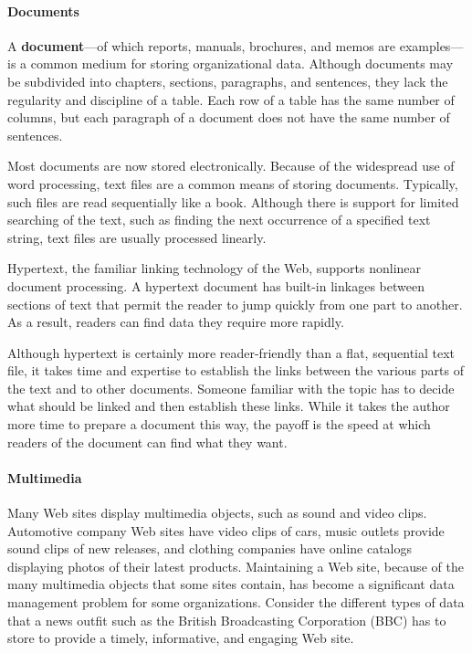 \documentclass[
]{article}
\begin{document}
\hypertarget{documents}{%
\paragraph*{Documents}\label{documents}}

A \textbf{document}---of which reports, manuals, brochures, and memos are
examples---is a common medium for storing organizational data. Although
documents may be subdivided into chapters, sections, paragraphs, and
sentences, they lack the regularity and discipline of a table. Each row
of a table has the same number of columns, but each paragraph of a
document does not have the same number of sentences.

Most documents are now stored electronically. Because of the widespread
use of word processing, text files are a common means of storing
documents. Typically, such files are read sequentially like a book.
Although there is support for limited searching of the text, such as
finding the next occurrence of a specified text string, text files are
usually processed linearly.

Hypertext, the familiar linking technology of the Web, supports
nonlinear document processing. A hypertext document has built-in
linkages between sections of text that permit the reader to jump quickly
from one part to another. As a result, readers can find data they
require more rapidly.

Although hypertext is certainly more reader-friendly than a flat,
sequential text file, it takes time and expertise to establish the links
between the various parts of the text and to other documents. Someone
familiar with the topic has to decide what should be linked and then
establish these links. While it takes the author more time to prepare a
document this way, the payoff is the speed at which readers of the
document can find what they want.

\hypertarget{multimedia}{%
\paragraph*{Multimedia}\label{multimedia}}

Many Web sites display multimedia objects, such as sound and video
clips. Automotive company Web sites have video clips of cars, music
outlets provide sound clips of new releases, and clothing companies have
online catalogs displaying photos of their latest products. Maintaining
a Web site, because of the many multimedia objects that some sites
contain, has become a significant data management problem for some
organizations. Consider the different types of data that a news outfit
such as the British Broadcasting Corporation (BBC) has to store to
provide a timely, informative, and engaging Web site.
\end{document}
